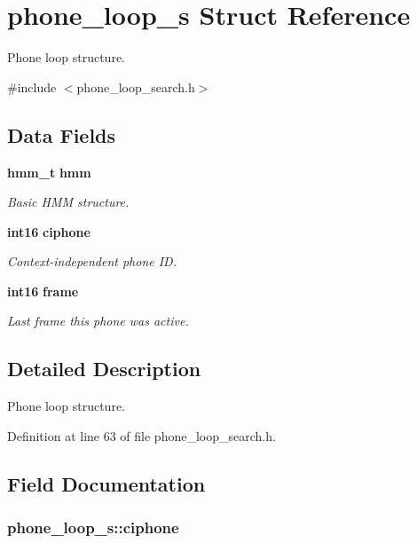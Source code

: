 \section{phone\-\_\-loop\-\_\-s \-Struct \-Reference}
\label{structphone__loop__s}


\-Phone loop structure.  




{\ttfamily \#include $<$phone\-\_\-loop\-\_\-search.\-h$>$}

\subsection*{\-Data \-Fields}
\begin{DoxyCompactItemize}
\item 
{\bf hmm\-\_\-t} {\bf hmm}
\begin{DoxyCompactList}\small\item\em \-Basic \-H\-M\-M structure. \end{DoxyCompactList}\item 
{\bf int16} {\bf ciphone}
\begin{DoxyCompactList}\small\item\em \-Context-\/independent phone \-I\-D. \end{DoxyCompactList}\item 
{\bf int16} {\bf frame}
\begin{DoxyCompactList}\small\item\em \-Last frame this phone was active. \end{DoxyCompactList}\end{DoxyCompactItemize}


\subsection{\-Detailed \-Description}
\-Phone loop structure. 

\-Definition at line 63 of file phone\-\_\-loop\-\_\-search.\-h.



\subsection{\-Field \-Documentation}
\subsubsection[{ciphone}]{ {\bf phone\-\_\-loop\-\_\-s\-::ciphone}}\label{structphone__loop__s_a471523bb294d53b6c17799dfb5946e59}


